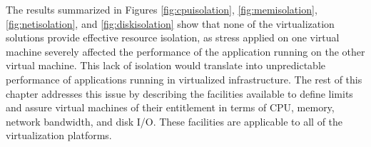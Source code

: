 The results summarized in Figures \ref{fig:cpuisolation}, \ref{fig:memisolation}, \ref{fig:netisolation}, and \ref{fig:diskisolation} show that none of the virtualization solutions provide effective resource isolation, as stress applied on one virtual machine severely affected the performance of the application running on the other virtual machine. This lack of isolation would translate into unpredictable performance of applications running in virtualized infrastructure. The rest of this chapter addresses this issue by describing the facilities available to define limits and assure virtual machines of their entitlement in terms of CPU, memory, network bandwidth, and disk I/O. These facilities are applicable to all of the virtualization platforms.








